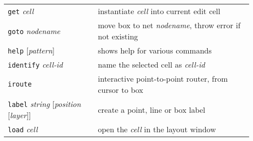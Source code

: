 \documentclass[10pt,a4paper]{article}
\newcommand{\mac}[1]{\texttt{#1}}
\newcommand{\argu}[1]{\textit{#1}}
\begin{document}
\begin{tabular}{p{}p{}}
		\mac{get} \argu{cell} & instantiate \argu{cell} into current edit cell\\
		\mac{goto} \argu{nodename} & move box to net \argu{nodename}, throw error if not existing\\
		\mac{help} [\argu{pattern}] & shows help for various commands\\
		\mac{identify} \argu{cell-id} & name the selected cell as \argu{cell-id}\\
		\mac{iroute} & interactive point-to-point router, from cursor to box\\
		\mac{label} \argu{string} [\argu{position} [\argu{layer}]] & create a point, line or box label\\
		\mac{load} \argu{cell} & open the \argu{cell} in the layout window\\
		\bottomrule
	\end{tabular}
	\newpage
\end{document}
